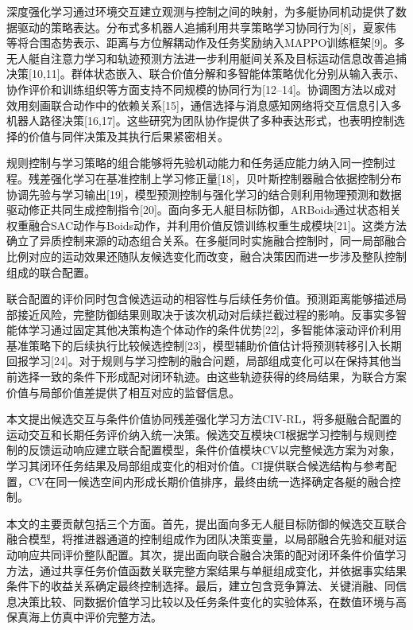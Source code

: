 \documentclass[
  11pt,
  fontset=none]{ctexart}
\begin{document}
深度强化学习通过环境交互建立观测与控制之间的映射，为多艇协同机动提供了数据驱动的策略表达。分布式多机器人追捕利用共享策略学习协同行为{[}8{]}，夏家伟等将合围态势表示、距离与方位解耦动作及任务奖励纳入MAPPO训练框架{[}9{]}。多无人艇自注意力学习和轨迹预测方法进一步利用艇间关系及目标运动信息改善追捕决策{[}10,11{]}。群体状态嵌入、联合价值分解和多智能体策略优化分别从输入表示、协作评价和训练组织等方面支持不同规模的协同行为{[}12--14{]}。协调图方法以成对效用刻画联合动作中的依赖关系{[}15{]}，通信选择与消息感知网络将交互信息引入多机器人路径决策{[}16,17{]}。这些研究为团队协作提供了多种表达形式，也表明控制选择的价值与同伴决策及其执行后果紧密相关。

规则控制与学习策略的组合能够将先验机动能力和任务适应能力纳入同一控制过程。残差强化学习在基准控制上学习修正量{[}18{]}，贝叶斯控制器融合依据控制分布协调先验与学习输出{[}19{]}，模型预测控制与强化学习的结合则利用物理预测和数据驱动修正共同生成控制指令{[}20{]}。面向多无人艇目标防御，ARBoids通过状态相关权重融合SAC动作与Boids动作，并利用价值反馈训练权重生成模块{[}21{]}。这类方法确立了异质控制来源的动态组合关系。在多艇同时实施融合控制时，同一局部融合比例对应的运动效果还随队友候选变化而改变，融合决策因而进一步涉及整队控制组成的联合配置。

联合配置的评价同时包含候选运动的相容性与后续任务价值。预测距离能够描述局部接近风险，完整防御结果则取决于该次机动对后续拦截过程的影响。反事实多智能体学习通过固定其他决策构造个体动作的条件优势{[}22{]}，多智能体滚动评价利用基准策略下的后续执行比较候选控制{[}23{]}，模型辅助价值估计将预测转移引入长期回报学习{[}24{]}。对于规则与学习控制的融合问题，局部组成变化可以在保持其他当前选择一致的条件下形成配对闭环轨迹。由这些轨迹获得的终局结果，为联合方案价值与局部价值差提供了相互对应的监督信息。

本文提出候选交互与条件价值协同残差强化学习方法CIV-RL，将多艇融合配置的运动交互和长期任务评价纳入统一决策。候选交互模块CI根据学习控制与规则控制的反馈运动响应建立联合配置模型，条件价值模块CV以完整候选方案为对象，学习其闭环任务结果及局部组成变化的相对价值。CI提供联合候选结构与参考配置，CV在同一候选空间内形成长期价值排序，最终由统一选择确定各艇的融合控制。

本文的主要贡献包括三个方面。首先，提出面向多无人艇目标防御的候选交互联合融合模型，将推进器通道的控制组成作为团队决策变量，以局部融合先验和艇对运动响应共同评价整队配置。其次，提出面向联合融合决策的配对闭环条件价值学习方法，通过共享任务价值函数关联完整方案结果与单艇组成变化，并依据事实结果条件下的收益关系确定最终控制选择。最后，建立包含竞争算法、关键消融、同信息决策比较、同数据价值学习比较以及任务条件变化的实验体系，在数值环境与高保真海上仿真中评价完整方法。
\end{document}
